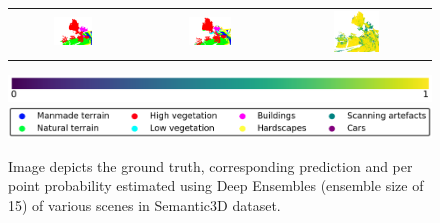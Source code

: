 \begin{figure}[h!]
\begin{tabular}{ccc}
            \includegraphics[width=0.33\textwidth, height=0.18\textheight]{images/seg_output/sem3d_seg_output/3_GT.pdf} &
            \includegraphics[width=0.33\textwidth, height=0.18\textheight]{images/seg_output/sem3d_seg_output/3_Pred.pdf}& 
            \includegraphics[width=0.33\textwidth, height=0.18\textheight]{images/seg_output/sem3d_seg_output/3_max_prob.pdf}\\
        \end{tabular}
        \includegraphics[scale=0.45]{images/prob_legend.pdf}
        \includegraphics[scale=0.45]{images/legend.png}
        \caption{Image depicts the ground truth, corresponding prediction and per point probability estimated using Deep Ensembles (ensemble size of 15) of various scenes in Semantic3D dataset.}
        \label{fig:de_sem3d_probmap}
    \end{figure}

